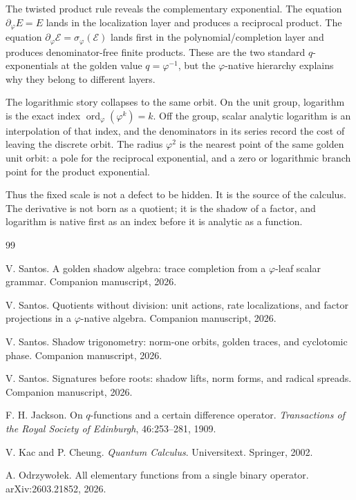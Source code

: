 \documentclass[11pt]{article}
\newcommand{\sig}{\sigma}
\newcommand{\ph}{\varphi}
\newcommand{\dd}{\partial_{\ph}}
\newcommand{\ord}{\operatorname{ord}}
\begin{document}
The twisted product rule reveals the complementary exponential.  The equation $\dd E=E$ lands in the localization layer and produces a reciprocal product.  The equation $\dd\mathcal E=\sig_{\ph}(\mathcal E)$ lands first in the polynomial/completion layer and produces denominator-free finite products.  These are the two standard $q$-exponentials at the golden value $q=\ph^{-1}$, but the $\ph$-native hierarchy explains why they belong to different layers.

The logarithmic story collapses to the same orbit.  On the unit group, logarithm is the exact index $\ord_{\ph}(\ph^k)=k$.  Off the group, scalar analytic logarithm is an interpolation of that index, and the denominators in its series record the cost of leaving the discrete orbit.  The radius $\ph^2$ is the nearest point of the same golden unit orbit: a pole for the reciprocal exponential, and a zero or logarithmic branch point for the product exponential.

Thus the fixed scale is not a defect to be hidden.  It is the source of the calculus.  The derivative is not born as a quotient; it is the shadow of a factor, and logarithm is native first as an index before it is analytic as a function.

\begin{thebibliography}{99}

V. Santos.
\newblock A golden shadow algebra: trace completion from a \(\varphi\)-leaf scalar grammar.
\newblock Companion manuscript, 2026.

V. Santos.
\newblock Quotients without division: unit actions, rate localizations, and factor projections in a \(\varphi\)-native algebra.
\newblock Companion manuscript, 2026.

V. Santos.
\newblock Shadow trigonometry: norm-one orbits, golden traces, and cyclotomic phase.
\newblock Companion manuscript, 2026.

V. Santos.
\newblock Signatures before roots: shadow lifts, norm forms, and radical spreads.
\newblock Companion manuscript, 2026.

F. H. Jackson.
\newblock On $q$-functions and a certain difference operator.
\newblock \emph{Transactions of the Royal Society of Edinburgh}, 46:253--281, 1909.

V. Kac and P. Cheung.
\newblock \emph{Quantum Calculus}.
\newblock Universitext. Springer, 2002.

A. Odrzywo\l{}ek.
\newblock All elementary functions from a single binary operator.
\newblock arXiv:2603.21852, 2026.

\end{thebibliography}
\end{document}

